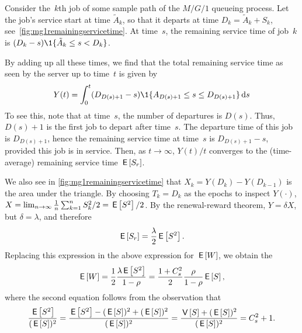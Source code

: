 \documentclass[queueing-book.tex]{subfiles}
\begin{document}
Consider the~$k$th job of some sample path of the $M/G/1$ queueing process.
Let the job's service start at time $\tilde A_k$, so that it departs at time $D_k=\tilde A_k + S_k$, see~\cref{fig:mg1remainingservicetime}.
At time~$s$,  the remaining service time of job~$k$ is
$(D_k-s)\1{\tilde A_k \leq s < D_k}$.
\begin{marginfigure}

 \caption{Remaining service time.}
 \label{fig:mg1remainingservicetime}
\end{marginfigure}
By adding up all these times, we find that the total remaining service time as seen by the server up to time~$t$ is given by
 \begin{equation*}
 Y(t) = \int_0^t (D_{D(s)+1}-s)\1{A_{D(s)+1} \leq s \leq D_{D(s)+1}} \d s
 \end{equation*}
To see this, note that at time~$s$, the number of departures is $D(s)$.
 Thus, $D(s)+1$ is the first job to depart after time~$s$.
 The departure time of this job is $D_{D(s)+1}$, hence the remaining service time at time~$s$ is $D_{D(s)+1}-s$, provided this job is in service.
Then, as $t \to \infty$, $Y(t)/t$ converges to the  (time-average) remaining service time $\,\mathsf{E}\left[S_r\right]$.

 We also see in \cref{fig:mg1remainingservicetime} that $X_k = Y(D_k) - Y(D_{k-1})$ is the area under the triangle.
 By choosing $T_k=D_k$ as the epochs to inspect $Y(\cdot)$, $X=\lim_{n\to\infty} \frac{1}{n}\sum_{k=1}^n S_k^2/ 2 = \,\mathsf{E}\left[S^2\right]/2$.
 By the renewal-reward theorem, $Y=\delta X$, but $\delta = \lambda$, and therefore
\begin{equation*}
\,\mathsf{E}\left[S_r\right] = \frac{\lambda}2 \,\mathsf{E}\left[S^2\right].
\end{equation*}
Replacing this expression in the above expression for $\,\mathsf{E}\left[W\right]$, we obtain the 
\begin{equation*}
 \,\mathsf{E}\left[W\right] = \frac 1 2 \frac{\lambda \,\mathsf{E}\left[S^2\right]}{1-\rho} =\frac{1 + C_s^2}2 \frac{\rho}{1-\rho} \,\mathsf{E}\left[S\right],
\end{equation*}
where the second equation follows from  the observation that
\begin{equation*}
\frac{\,\mathsf{E}\left[S^2\right]}{(\,\mathsf{E}\left[S\right])^2} =  \frac{\,\mathsf{E}\left[S^2\right] - (\,\mathsf{E}\left[S\right])^{2} + (\,\mathsf{E}\left[S\right])^{2}}{(\,\mathsf{E}\left[S\right])^2} = \frac{\,\mathsf{V}\left[S\right] + (\,\mathsf{E}\left[S\right])^{2}}{(\,\mathsf{E}\left[S\right])^{2}} = C_s^2 +1.
\end{equation*}
\end{document}
